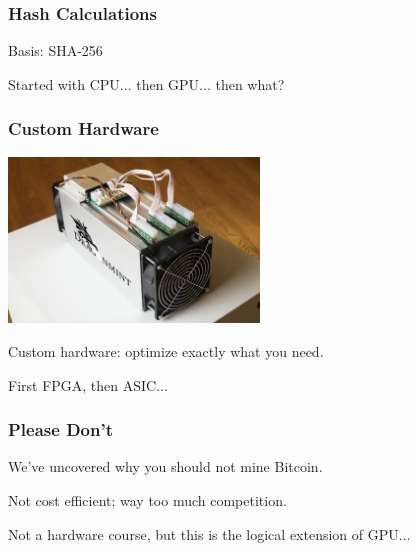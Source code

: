 \begin{frame}
\frametitle{Hash Calculations}

Basis: SHA-256

Started with CPU... then GPU... then what?


\end{frame}

\begin{frame}
\frametitle{Custom Hardware}

\begin{center}
	\includegraphics[width=0.5\textwidth]{images/dragonmint.jpeg}
\end{center}

Custom hardware: optimize exactly what you need.

First FPGA, then ASIC...

\end{frame}


\begin{frame}
\frametitle{Please Don't}

We've uncovered why you should not mine Bitcoin.

Not cost efficient; way too much competition.

Not a hardware course, but this is the logical extension of GPU...

\end{frame}






